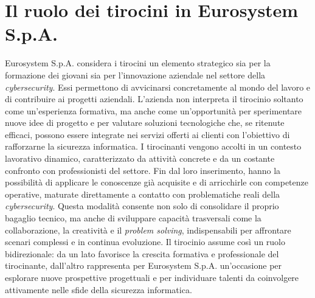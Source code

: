 \section{Il ruolo dei tirocini in Eurosystem S.p.A.}
Eurosystem S.p.A. considera i tirocini un elemento strategico sia per la formazione dei giovani sia per l'innovazione aziendale nel settore della \textit{cybersecurity}.  
Essi permettono di avvicinarsi concretamente al mondo del lavoro e di contribuire ai progetti aziendali.  
L'azienda non interpreta il tirocinio soltanto come un'esperienza formativa, ma anche come un'opportunità per sperimentare nuove idee di progetto e per valutare soluzioni tecnologiche che, se ritenute efficaci, possono essere integrate nei servizi offerti ai clienti con l'obiettivo di rafforzarne la sicurezza informatica.  
I tirocinanti vengono accolti in un contesto lavorativo dinamico, caratterizzato da attività concrete e da un costante confronto con professionisti del settore.  
Fin dal loro inserimento, hanno la possibilità di applicare le conoscenze già acquisite e di arricchirle con competenze operative, maturate direttamente a contatto con problematiche reali della \textit{cybersecurity}.  
Questa modalità consente non solo di consolidare il proprio bagaglio tecnico, ma anche di sviluppare capacità trasversali come la collaborazione, la creatività e il \textit{problem solving}, indispensabili per affrontare scenari complessi e in continua evoluzione.  
Il tirocinio assume così un ruolo bidirezionale: da un lato favorisce la crescita formativa e professionale del tirocinante, dall'altro rappresenta per Eurosystem S.p.A. un'occasione per esplorare nuove prospettive progettuali e per individuare talenti da coinvolgere attivamente nelle sfide della sicurezza informatica.  